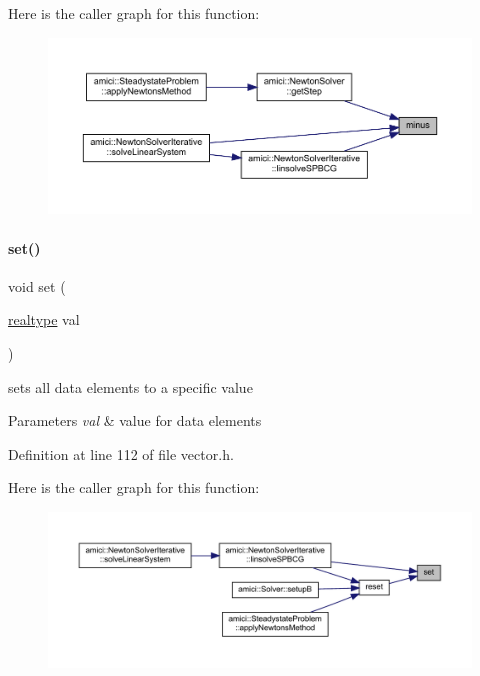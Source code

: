 Here is the caller graph for this function\+:
\nopagebreak
\begin{figure}[H]
\begin{center}
\leavevmode
\includegraphics[width=350pt]{classamici_1_1_ami_vector_a19ad39a609bfc430ed6f7992e841b024_icgraph}
\end{center}
\end{figure}
\mbox{\label{classamici_1_1_ami_vector_a11418c829db7c2891d63491cf12d29b4}} 
\paragraph{\texorpdfstring{set()}{set()}}
{\footnotesize\ttfamily void set (\begin{DoxyParamCaption}\item[{\mbox{\hyperlink{namespaceamici_a1bdce28051d6a53868f7ccbf5f2c14a3}{realtype}}}]{val }\end{DoxyParamCaption})}

sets all data elements to a specific value 
\begin{DoxyParams}{Parameters}
{\em val} & value for data elements \\
\hline
\end{DoxyParams}


Definition at line 112 of file vector.\+h.

Here is the caller graph for this function\+:
\nopagebreak
\begin{figure}[H]
\begin{center}
\leavevmode
\includegraphics[width=350pt]{classamici_1_1_ami_vector_a11418c829db7c2891d63491cf12d29b4_icgraph}
\end{center}
\end{figure}
\mbox{\label{classamici_1_1_ami_vector_a3cea12a1bf8945da7c2d39b9ee526ed2}} 
